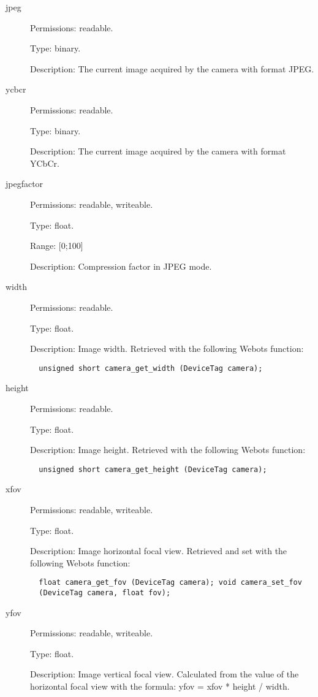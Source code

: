 \begin{description}
\item[{jpeg}] Permissions: readable.


  Type: binary.


  Description: The current image acquired by the camera with format
  JPEG.

\item[{ycbcr}] Permissions: readable.


  Type: binary.


  Description: The current image acquired by the camera with format
  YCbCr.

\item[{jpegfactor}] Permissions: readable, writeable.


  Type: float.


  Range: [0;100]


  Description: Compression factor in JPEG mode.
\item[{width}] Permissions: readable.


  Type: float.


  Description: Image width. Retrieved with the following Webots
  function:


\begin{lstlisting}
  unsigned short camera_get_width (DeviceTag camera);
\end{lstlisting}
\item[{height}] Permissions: readable.


  Type: float.


  Description: Image height. Retrieved with the following Webots
  function:


\begin{lstlisting}
  unsigned short camera_get_height (DeviceTag camera);
\end{lstlisting}
\item[{xfov}] Permissions: readable, writeable.


  Type: float.


  Description: Image horizontal focal view.  Retrieved and set with
  the following Webots function:


\begin{lstlisting}
  float camera_get_fov (DeviceTag camera); void camera_set_fov
  (DeviceTag camera, float fov);
\end{lstlisting}
\item[{yfov}] Permissions: readable, writeable.


  Type: float.


  Description: Image vertical focal view. Calculated from the value of
  the horizontal focal view with the formula: yfov = xfov * height /
  width.


\end{description}
